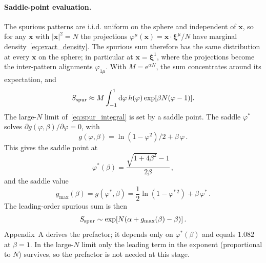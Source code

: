 \documentclass[letterpaper]{article} %
\newcommand{\bxi}{\boldsymbol{\xi}}
\newcommand{\bx}{\bm{x}}
\newcommand{\e}{{\mathrm{e}}}
\newcommand{\dd}{{\mathrm{d}}}
\newcommand{\Bnet}{\beta}
\newcommand{\p}{\partial}
\begin{document}
\paragraph{Saddle-point evaluation.}
The spurious patterns are i.i.d. uniform on the sphere and independent of $\bx$,
so for any $\bx$ with $|\bx|^2 = N$ the projections
$\varphi^\mu(\bx) = \bx \cdot \bxi^\mu / N$ have marginal
density~\eqref{eq:exact_density}. The spurious sum therefore has the same
distribution at every $\bx$ on the sphere; in particular at $\bx = \bxi^1$, where
the projections become the inter-pattern alignments $\varphi_{1\mu}$. With
$M = \e^{\alpha N}$, the sum concentrates around its expectation, and
\begin{equation}
    S_{\rm spur} \approx M \int_{-1}^{1} \dd\varphi\, h(\varphi) \exp[\Bnet N(\varphi - 1)].
    \label{eq:spur_integral}
\end{equation}
The large-$N$ limit of~\eqref{eq:spur_integral} is set by a saddle point. The
saddle $\varphi^*$ solves $\p g(\varphi, \Bnet)/\p\varphi = 0$, with
\begin{equation}
    g(\varphi, \Bnet) = \ln(1-\varphi^2)/2 + \Bnet\,\varphi\,.
\end{equation}
This gives the saddle point at
\begin{equation}
\varphi^*(\Bnet) = \frac{\sqrt{1+4\Bnet^2} - 1}{2\Bnet}\,,
\label{eq:saddle}
\end{equation}
and the saddle value
\begin{equation}
g_{\max}(\Bnet) = g(\varphi^*, \Bnet) = \frac12 \ln(1 - \varphi^{*\,2}) + \Bnet\,\varphi^*\,.
\label{eq:saddle_value}
\end{equation}
The leading-order spurious sum is then
\begin{equation}
    S_{\rm spur} \sim \exp[N(\alpha + g_{\max}(\Bnet) - \Bnet)]\,.
    \label{eq:spurious_saddle}
\end{equation}
Appendix~A derives the prefactor; it depends only on $\varphi^*(\Bnet)$ and equals
$1.082$ at $\Bnet = 1$. In the large-$N$ limit only the leading term in the
exponent (proportional to $N$) survives, so the prefactor is not needed at this
stage.
\end{document}
